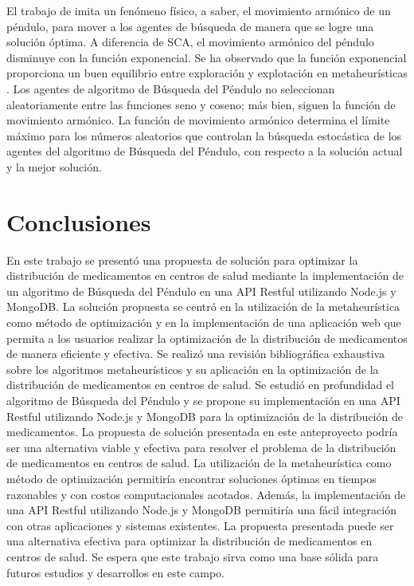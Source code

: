 \documentclass[conference]{IEEEtran}
\begin{document}
El trabajo de \cite{aziz2022} imita un fenómeno físico, a saber, el movimiento
armónico
de un péndulo, para mover a los agentes de búsqueda de manera que se logre una
solución óptima. A diferencia de SCA, el movimiento armónico del péndulo
disminuye con la función exponencial. Se ha observado que la función
exponencial proporciona un buen equilibrio entre exploración y explotación en
metaheurísticas \cite{aziz2018singlesolution, rahman2018singleagent}. Los
agentes de algoritmo de Búsqueda del Péndulo no seleccionan aleatoriamente
entre
las funciones seno y coseno; más bien, siguen la función de movimiento
armónico. La función de movimiento armónico determina el límite máximo para los
números aleatorios que controlan la búsqueda estocástica de los agentes del
algoritmo de Búsqueda del Péndulo,
con respecto a la solución actual y la mejor solución.

\section{Conclusiones}
\label{sec:Conclusiones}
En este trabajo se presentó una propuesta de solución para optimizar la
distribución de medicamentos en centros de salud mediante la implementación de
un algoritmo de Búsqueda del Péndulo en una API Restful utilizando
Node.js y MongoDB. La solución propuesta se centró en la utilización de la
metaheurística como método de optimización y en la implementación de una
aplicación web que permita a los usuarios realizar la optimización de la
distribución de medicamentos de manera eficiente y efectiva.
Se realizó una revisión bibliográfica exhaustiva sobre los algoritmos
metaheurísticos y su aplicación en la optimización de la distribución de
medicamentos en centros de salud. Se estudió en profundidad el algoritmo de
Búsqueda del Péndulo y se propone su implementación en una API Restful
utilizando Node.js y MongoDB para la optimización de la distribución de
medicamentos.
La propuesta de solución presentada en este anteproyecto podría ser una
alternativa viable y efectiva para resolver el problema de la distribución de
medicamentos en centros de salud. La utilización de la metaheurística como
método de optimización permitiría encontrar soluciones óptimas en tiempos
razonables y con costos computacionales acotados. Además, la implementación de
una API Restful utilizando Node.js y MongoDB permitiría una fácil integración
con otras aplicaciones y sistemas existentes.
La propuesta presentada puede ser una alternativa efectiva para optimizar la
distribución de medicamentos en centros de salud. Se espera que este trabajo
sirva como una base sólida para futuros estudios y desarrollos en este campo.



\end{document}
